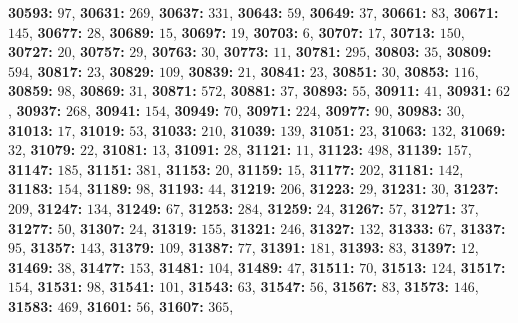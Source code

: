 \textsf{\bfseries 30593:} $97$, \textsf{\bfseries 30631:} $269$, \textsf{\bfseries 30637:} $331$, \textsf{\bfseries 30643:} $59$, \textsf{\bfseries 30649:} $37$, \textsf{\bfseries 30661:} $83$, \textsf{\bfseries 30671:} $145$, \textsf{\bfseries 30677:} $28$, \textsf{\bfseries 30689:} $15$, \textsf{\bfseries 30697:} $19$, \textsf{\bfseries 30703:} $6$, \textsf{\bfseries 30707:} $17$, \textsf{\bfseries 30713:} $150$, \textsf{\bfseries 30727:} $20$, \textsf{\bfseries 30757:} $29$, \textsf{\bfseries 30763:} $30$, \textsf{\bfseries 30773:} $11$, \textsf{\bfseries 30781:} $295$, \textsf{\bfseries 30803:} $35$, \textsf{\bfseries 30809:} $594$, \textsf{\bfseries 30817:} $23$, \textsf{\bfseries 30829:} $109$, \textsf{\bfseries 30839:} $21$, \textsf{\bfseries 30841:} $23$, \textsf{\bfseries 30851:} $30$, \textsf{\bfseries 30853:} $116$, \textsf{\bfseries 30859:} $98$, \textsf{\bfseries 30869:} $31$, \textsf{\bfseries 30871:} $572$, \textsf{\bfseries 30881:} $37$, \textsf{\bfseries 30893:} $55$, \textsf{\bfseries 30911:} $41$, \textsf{\bfseries 30931:} $62$, \textsf{\bfseries 30937:} $268$, \textsf{\bfseries 30941:} $154$, \textsf{\bfseries 30949:} $70$, \textsf{\bfseries 30971:} $224$, \textsf{\bfseries 30977:} $90$, \textsf{\bfseries 30983:} $30$, \textsf{\bfseries 31013:} $17$, \textsf{\bfseries 31019:} $53$, \textsf{\bfseries 31033:} $210$, \textsf{\bfseries 31039:} $139$, \textsf{\bfseries 31051:} $23$, \textsf{\bfseries 31063:} $132$, \textsf{\bfseries 31069:} $32$, \textsf{\bfseries 31079:} $22$, \textsf{\bfseries 31081:} $13$, \textsf{\bfseries 31091:} $28$, \textsf{\bfseries 31121:} $11$, \textsf{\bfseries 31123:} $498$, \textsf{\bfseries 31139:} $157$, \textsf{\bfseries 31147:} $185$, \textsf{\bfseries 31151:} $381$, \textsf{\bfseries 31153:} $20$, \textsf{\bfseries 31159:} $15$, \textsf{\bfseries 31177:} $202$, \textsf{\bfseries 31181:} $142$, \textsf{\bfseries 31183:} $154$, \textsf{\bfseries 31189:} $98$, \textsf{\bfseries 31193:} $44$, \textsf{\bfseries 31219:} $206$, \textsf{\bfseries 31223:} $29$, \textsf{\bfseries 31231:} $30$, \textsf{\bfseries 31237:} $209$, \textsf{\bfseries 31247:} $134$, \textsf{\bfseries 31249:} $67$, \textsf{\bfseries 31253:} $284$, \textsf{\bfseries 31259:} $24$, \textsf{\bfseries 31267:} $57$, \textsf{\bfseries 31271:} $37$, \textsf{\bfseries 31277:} $50$, \textsf{\bfseries 31307:} $24$, \textsf{\bfseries 31319:} $155$, \textsf{\bfseries 31321:} $246$, \textsf{\bfseries 31327:} $132$, \textsf{\bfseries 31333:} $67$, \textsf{\bfseries 31337:} $95$, \textsf{\bfseries 31357:} $143$, \textsf{\bfseries 31379:} $109$, \textsf{\bfseries 31387:} $77$, \textsf{\bfseries 31391:} $181$, \textsf{\bfseries 31393:} $83$, \textsf{\bfseries 31397:} $12$, \textsf{\bfseries 31469:} $38$, \textsf{\bfseries 31477:} $153$, \textsf{\bfseries 31481:} $104$, \textsf{\bfseries 31489:} $47$, \textsf{\bfseries 31511:} $70$, \textsf{\bfseries 31513:} $124$, \textsf{\bfseries 31517:} $154$, \textsf{\bfseries 31531:} $98$, \textsf{\bfseries 31541:} $101$, \textsf{\bfseries 31543:} $63$, \textsf{\bfseries 31547:} $56$, \textsf{\bfseries 31567:} $83$, \textsf{\bfseries 31573:} $146$, \textsf{\bfseries 31583:} $469$, \textsf{\bfseries 31601:} $56$, \textsf{\bfseries 31607:} $365$, 
